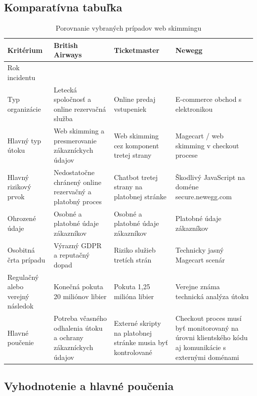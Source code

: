 \subsection{Komparatívna tabuľka}

\begin{table}[htbp]
    \centering
    \caption{Porovnanie vybraných prípadov web skimmingu}
    \label{tab:comparison-cases}
    \footnotesize
    \renewcommand{\arraystretch}{1.18}
    \begin{tabularx}{\textwidth}{@{}>{\raggedright\arraybackslash}p{}>{\raggedright\arraybackslash}X>{\raggedright\arraybackslash}X>{\raggedright\arraybackslash}X@{}}
        \toprule
        \textbf{Kritérium} & \textbf{British Airways} & \textbf{Ticketmaster} & \textbf{Newegg} \\
        \midrule
        Rok incidentu & 2018 & 2018 & 2018 \\
        Typ organizácie & Letecká spoločnosť a online rezervačná služba & Online predaj vstupeniek & E-commerce obchod s elektronikou \\
        Hlavný typ útoku & Web skimming a presmerovanie zákazníckych údajov & Web skimming cez komponent tretej strany & Magecart / web skimming v checkout procese \\
        Hlavný rizikový prvok & Nedostatočne chránený online rezervačný a platobný proces & Chatbot tretej strany na platobnej stránke & Škodlivý JavaScript na doméne secure.newegg.com \\
        Ohrozené údaje & Osobné a platobné údaje zákazníkov & Osobné a platobné údaje zákazníkov & Platobné údaje zákazníkov \\
        Osobitná črta prípadu & Výrazný GDPR a reputačný dopad & Riziko služieb tretích strán & Technicky jasný Magecart scenár \\
        Regulačný alebo verejný následok & Konečná pokuta 20 miliónov libier & Pokuta 1,25 milióna libier & Verejne známa technická analýza útoku \\
        Hlavné poučenie & Potreba včasného odhalenia útoku a ochrany zákazníckych údajov & Externé skripty na platobnej stránke musia byť kontrolované & Checkout proces musí byť monitorovaný na úrovni klientského kódu aj komunikácie s externými doménami \\
        \bottomrule
    \end{tabularx}
\end{table}

\subsection{Vyhodnotenie a hlavné poučenia}

